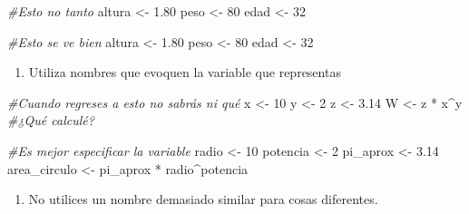 \documentclass[]{tufte-book}
\newenvironment{Shaded}{}{}
\newcommand{\CommentTok}[1]{\textcolor[rgb]{0.38,0.63,0.69}{\textit{#1}}}
\newcommand{\DecValTok}[1]{\textcolor[rgb]{0.25,0.63,0.44}{#1}}
\newcommand{\FloatTok}[1]{\textcolor[rgb]{0.25,0.63,0.44}{#1}}
\newcommand{\NormalTok}[1]{#1}
\newcommand{\OtherTok}[1]{\textcolor[rgb]{0.00,0.44,0.13}{#1}}
\newcommand{\SpecialCharTok}[1]{\textcolor[rgb]{0.25,0.44,0.63}{#1}}
\providecommand{\tightlist}{%
  \setlength{\itemsep}{0pt}\setlength{\parskip}{0pt}}
\begin{document}
\begin{Shaded}
\begin{Highlighting}[]
\CommentTok{\#Esto no tanto}
\NormalTok{altura }\OtherTok{\textless{}{-}} \FloatTok{1.80}
\NormalTok{peso }\OtherTok{\textless{}{-}} \DecValTok{80}
\NormalTok{edad }\OtherTok{\textless{}{-}} \DecValTok{32}

\CommentTok{\#Esto se ve bien}
\NormalTok{altura }\OtherTok{\textless{}{-}} \FloatTok{1.80}
\NormalTok{peso   }\OtherTok{\textless{}{-}} \DecValTok{80}
\NormalTok{edad   }\OtherTok{\textless{}{-}} \DecValTok{32}
\end{Highlighting}
\end{Shaded}

\begin{enumerate}
\def\labelenumi{\arabic{enumi}.}
\setcounter{enumi}{3}
\tightlist
\item
  Utiliza nombres que evoquen la variable que representas
\end{enumerate}

\begin{Shaded}
\begin{Highlighting}[]
\CommentTok{\#Cuando regreses a esto no sabrás ni qué}
\NormalTok{x }\OtherTok{\textless{}{-}} \DecValTok{10}
\NormalTok{y }\OtherTok{\textless{}{-}} \DecValTok{2}
\NormalTok{z }\OtherTok{\textless{}{-}} \FloatTok{3.14}
\NormalTok{W }\OtherTok{\textless{}{-}}\NormalTok{ z }\SpecialCharTok{*}\NormalTok{ x}\SpecialCharTok{\^{}}\NormalTok{y }\CommentTok{\#¿Qué calculé?}

\CommentTok{\#Es mejor especificar la variable}
\NormalTok{radio        }\OtherTok{\textless{}{-}} \DecValTok{10}
\NormalTok{potencia     }\OtherTok{\textless{}{-}} \DecValTok{2}
\NormalTok{pi\_aprox     }\OtherTok{\textless{}{-}} \FloatTok{3.14}
\NormalTok{area\_circulo }\OtherTok{\textless{}{-}}\NormalTok{ pi\_aprox }\SpecialCharTok{*}\NormalTok{ radio}\SpecialCharTok{\^{}}\NormalTok{potencia}
\end{Highlighting}
\end{Shaded}

\begin{enumerate}
\def\labelenumi{\arabic{enumi}.}
\setcounter{enumi}{4}
\tightlist
\item
  No utilices un nombre demasiado similar para cosas diferentes.
\end{enumerate}
\end{document}
